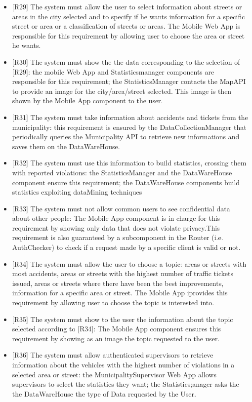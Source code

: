 \documentclass[a4paper]{report}
\begin{document}
\begin{itemize}
\item {[R29]}	\label{R29}The system must allow the user to select information about streets or areas in the city selected and to specify if he wants information for a specific street or area or a classification of streets or areas. The Mobile Web App is responsible for this requirement by allowing user to choose the area or street he wants.
\item {[R30]}	\label{R30}The system must show the the data corresponding to the selection of [R29]: the mobile Web App and Statisticsmanager components are responsible for this requirement; the StatisticsManager contacts the MapAPI to provide an image for the city/area/street selected. This image is then shown by the Mobile App component to the user.
\item {[R31]}	\label{R31}The system must take information about accidents and tickets from the municipality: this requirement is ensured by the DataCollectionManager that periodically queries the Municipality API to retrieve new informations and saves them on the DataWareHouse.
\item {[R32]}	\label{R32}The system must use this information to build statistics, crossing them with reported violations: the StatisticsManager and the DataWareHouse component ensure this requirement; the DataWareHouse components build statistics exploiting dataMining techniques
\item {[R33]}	\label{R33}The system must not allow common users to see confidential data about other people: The Mobile App component is in charge for this requirement by showing only data that does not violate privacy.This requirement is also guaranteed by a subcomponent in the Router (i.e. AuthChecker) to check if a request made by a specific client is valid or not.
\item {[R34]}	\label{R34}The system must allow the user to choose a topic: areas or streets with most accidents, areas or streets with the highest number of traffic tickets issued, areas or streets where there have been the best improvements, information for a specific area or street. The Mobile App iprovides this requirement by allowing user to choose the topic is interested into.
\item {[R35]}	\label{R35}The system must show to the user the information about the topic selected according to [R34]: The Mobile App component ensures this requirement by showing as an image the topic requested to the user.
\item {[R36]}	\label{R36}The system must allow authenticated supervisors to retrieve information about the vehicles with the highest number of violations in a selected area or street: the MunicipalitySupervisor Web App allows supervisors to select the statistics they want; the Statistics;anager asks the the DataWareHouse the type of Data requested by the User.

\end{itemize}
\end{document}
